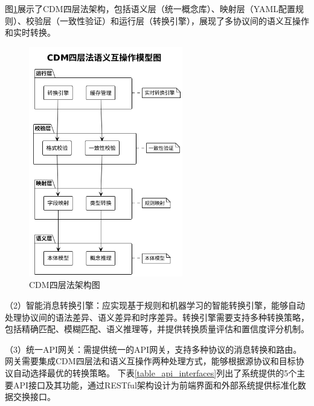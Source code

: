 图\ref{fig_cdm_architecture}展示了CDM四层法架构，包括语义层（统一概念库）、映射层（YAML配置规则）、校验层（一致性验证）和运行层（转换引擎），展现了多协议间的语义互操作和实时转换。

\begin{figure}[H]
    \centering
    \includegraphics[width=0.6\textwidth,height=0.5\textheight,keepaspectratio]{chapters/fig-0/cdm_four_layer_simple.png}
    \caption{CDM四层法架构图}
    \label{fig_cdm_architecture}
\end{figure}

（2）智能消息转换引擎：应实现基于规则和机器学习的智能转换引擎，能够自动处理协议间的语法差异、语义差异和时序差异。转换引擎需要支持多种转换策略，包括精确匹配、模糊匹配、语义推理等，并提供转换质量评估和置信度评分机制。

（3）统一API网关：需提供统一的API网关，支持多种协议的消息转换和路由。网关需要集成CDM四层法和语义互操作两种处理方式，能够根据源协议和目标协议自动选择最优的转换策略。
下表\ref{table_api_interfaces}列出了系统提供的5个主要API接口及其功能，通过RESTful架构设计为前端界面和外部系统提供标准化数据交换接口。

